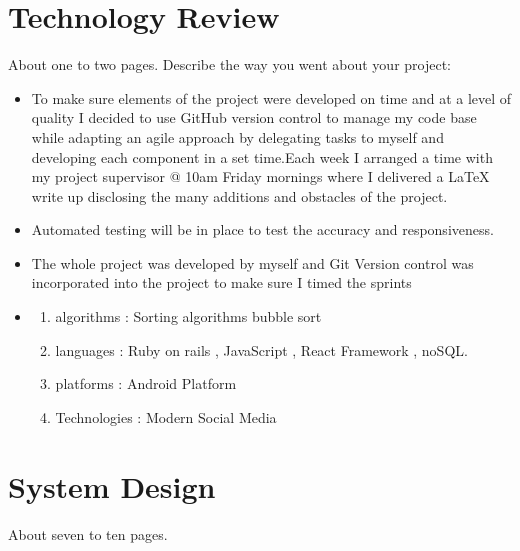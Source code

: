 \chapter{Technology Review}
About one to two pages.
Describe the way you went about your project:
\begin{itemize}
\item  %
To make sure elements of the project were developed on time and at a level of quality I decided to use GitHub version control to manage my code base while adapting an agile approach by delegating tasks to myself and developing each component in a set time.Each week I arranged a time  with my project supervisor @ 10am Friday mornings where I delivered a LaTeX write up disclosing the many additions and obstacles of the project.


\item %

Automated testing will be in place to test the accuracy and responsiveness.


\item %

The whole project was developed by myself and Git Version control was incorporated into the project to make sure I timed the sprints 


\item %



\begin{enumerate}
  \item algorithms : Sorting algorithms bubble sort
  \item languages  : Ruby on rails , JavaScript , React Framework , noSQL.  
\item platforms  : Android Platform

\item Technologies   : Modern Social Media 

\end{enumerate}

\end{itemize}

\chapter{System Design}
 About seven to ten pages.
 

